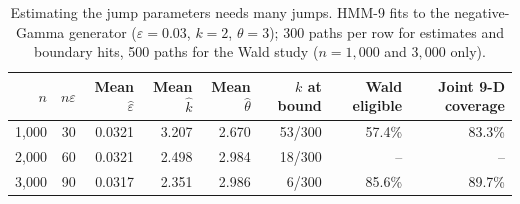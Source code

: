 \documentclass[11pt,a4paper]{article}
\theoremstyle{definition}
\theoremstyle{remark}
\begin{document}
\begin{table}[ht]\centering\footnotesize\setlength{\tabcolsep}{4pt}
\caption{Estimating the jump parameters needs many jumps. HMM-9 fits to the negative-Gamma generator ($\varepsilon=0.03$, $k=2$, $\theta=3$); 300 paths per row for estimates and boundary hits, 500 paths for the Wald study ($n=1{,}000$ and $3{,}000$ only).}\label{tab:hmm9info}
\begin{tabular}{rrrrrrrr}
\toprule
$n$ & $n\varepsilon$ & Mean $\hat\varepsilon$ & Mean $\hat k$ & Mean $\hat\theta$ & $k$ at bound & Wald eligible & Joint 9-D coverage\\
\midrule
1{,}000 & 30 & 0.0321 & 3.207 & 2.670 & 53/300 & 57.4\% & 83.3\%\\
2{,}000 & 60 & 0.0321 & 2.498 & 2.984 & 18/300 & -- & --\\
3{,}000 & 90 & 0.0317 & 2.351 & 2.986 & 6/300 & 85.6\% & 89.7\%\\
\bottomrule
\end{tabular}
\end{table}
\end{document}
